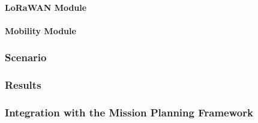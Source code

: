 \paragraph{LoRaWAN Module}

\paragraph{Mobility Module}

\subsubsection{Scenario}

\subsubsection{Results}

\subsubsection{Integration with the Mission Planning Framework}
